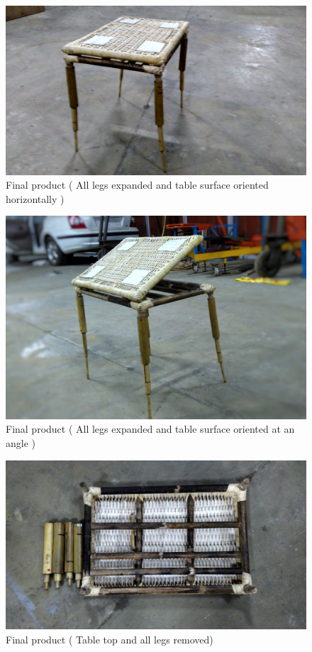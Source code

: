\begin{figure}[h]
    \centering
    \includegraphics[width=\linewidth]{fi2}
    \caption{Final product ( All legs expanded and table surface oriented horizontally )}
    \label{fig:mesh2}
\end{figure}

\begin{figure}[h]
    \centering
    \includegraphics[width=\linewidth]{fi3}
    \caption{Final product ( All legs expanded and table surface oriented at an angle )}
    \label{fig:mesh3}
\end{figure}

\begin{figure}[h]
    \centering
    \includegraphics[width=\linewidth]{fi4}
    \caption{Final product ( Table top and all legs removed)}
    \label{fig:mesh4}
\end{figure}


